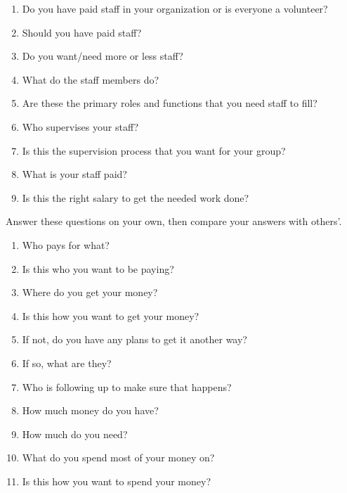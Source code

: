 \begin{enumerate}

\item
  Do you have paid staff in your organization
  or is everyone a volunteer?

\item
  Should you have paid staff?

\item
  Do you want/need more or less staff?

\item
  What do the staff members do?

\item
  Are these the primary roles and functions that you need staff to fill?

\item
  Who supervises your staff?

\item
  Is this the supervision process that you want for your group?

\item
  What is your staff paid?

\item
  Is this the right salary to get the needed work done?

\end{enumerate}


Answer these questions on your own,
then compare your answers with others'.

\begin{enumerate}

\item
  Who pays for what?

\item
  Is this who you want to be paying?

\item
  Where do you get your money?

\item
  Is this how you want to get your money?

\item
  If not, do you have any plans to get it another way?

\item
  If so, what are they?

\item
  Who is following up to make sure that happens?

\item
  How much money do you have?

\item
  How much do you need?

\item
  What do you spend most of your money on?

\item
  Is this how you want to spend your money?

\end{enumerate}


